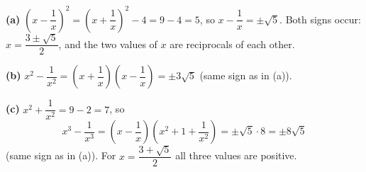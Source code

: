 \textbf{(a)} $\left(x-\dfrac{1}{x}\right)^2=\left(x+\dfrac{1}{x}\right)^2-4=9-4=5$, so $x-\dfrac{1}{x}=\boxed{\pm\sqrt5}$. Both signs occur: $x=\dfrac{3\pm\sqrt5}{2}$, and the two values of $x$ are reciprocals of each other.

\textbf{(b)} $x^2-\dfrac{1}{x^2}=\left(x+\dfrac{1}{x}\right)\left(x-\dfrac{1}{x}\right)=\boxed{\pm3\sqrt5}$ (same sign as in (a)).

\textbf{(c)} $x^2+\dfrac{1}{x^2}=9-2=7$, so
\[
x^3-\dfrac{1}{x^3}=\left(x-\dfrac{1}{x}\right)\left(x^2+1+\dfrac{1}{x^2}\right)=\pm\sqrt5\cdot8=\boxed{\pm8\sqrt5}
\]
(same sign as in (a)). For $x=\dfrac{3+\sqrt5}{2}$ all three values are positive.
